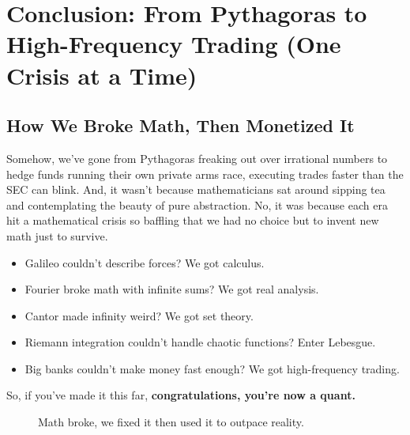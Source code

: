 \section{Conclusion: From Pythagoras to High-Frequency Trading (One Crisis at a Time)}

\subsection{How We Broke Math, Then Monetized It}

Somehow, we've gone from Pythagoras freaking out over irrational numbers to hedge funds running their own private arms race, executing trades faster than the SEC can blink. And, it wasn’t because mathematicians sat around sipping tea and contemplating the beauty of pure abstraction. No, it was because each era hit a mathematical crisis so baffling that we had no choice but to invent new math just to survive.

\begin{itemize}
    \item Galileo couldn't describe forces? We got calculus.
    \item Fourier broke math with infinite sums? We got real analysis.
    \item Cantor made infinity weird? We got set theory.
    \item Riemann integration couldn't handle chaotic functions? Enter Lebesgue.
    \item Big banks couldn't make money fast enough? We got high-frequency trading.
\end{itemize}

So, if you've made it this far, \textbf{congratulations, you’re now a quant.}

\begin{figure}[H]
\centering
{}
\caption{Math broke, we fixed it then used it to outpace reality.}
\end{figure}



